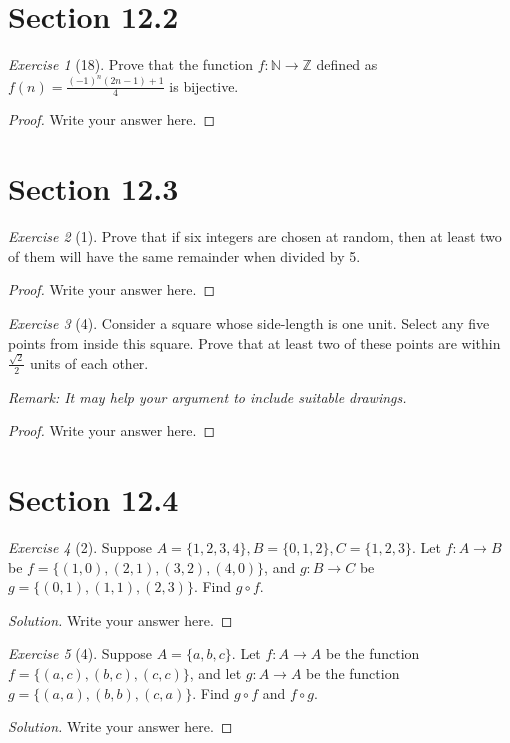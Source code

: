 \documentclass[12pt]{amsart}
\theoremstyle{remark}
\newtheorem*{exercise}{Exercise}%
\def\NN{\ensuremath{\mathbb N}}
\def\ZZ{\ensuremath{\mathbb Z}}
\theoremstyle{mycomment}
\begin{document}
\thispagestyle{fancy}
\section*{Section 12.2} 
\begin{exercise}[18] Prove that the function $f:\NN\to\ZZ$ defined as $f(n)=\frac{(-1)^{n}(2n-1)+1}{4}$ is bijective.
\begin{proof}
Write your answer here.
\end{proof}
\end{exercise}

\section*{Section 12.3}
\begin{exercise}[1] Prove that if six integers are chosen at random, then at least two of them will have the same remainder when divided by 5.
\begin{proof}
Write your answer here.
\end{proof}
\end{exercise}

\begin{exercise}[4] Consider a square whose side-length is one unit. Select any five points from  inside this square. Prove that at least two of these points are within $\frac{\sqrt{2}}{2}$ units of each other.

\emph{Remark: It may help your argument to include suitable drawings.}
\begin{proof}
Write your answer here.
\end{proof}
\end{exercise}

\section*{Section 12.4}
\begin{exercise}[2] Suppose $A=\{1,2,3,4\}, B=\{0,1,2\}, C=\{1,2,3\}$. Let $f:A\to B$ be $f=\{(1,0),(2,1),(3,2),(4,0)\}$, and $g:B\to C$ be $g=\{(0,1),(1,1),(2,3)\}$. Find $g\circ f$.
\begin{proof}[Solution]
Write your answer here.
\end{proof}
\end{exercise}

\begin{exercise}[4] Suppose $A=\{a,b,c\}$. Let $f:A\to A$ be the function $f=\{(a,c),(b,c),(c,c)\}$, and let $g:A\to A$ be the function $g=\{(a,a),(b,b),(c,a)\}$. Find $g\circ f$ and $f\circ g$.
\begin{proof}[Solution]
Write your answer here.
\end{proof}
\end{exercise}
\end{document}
